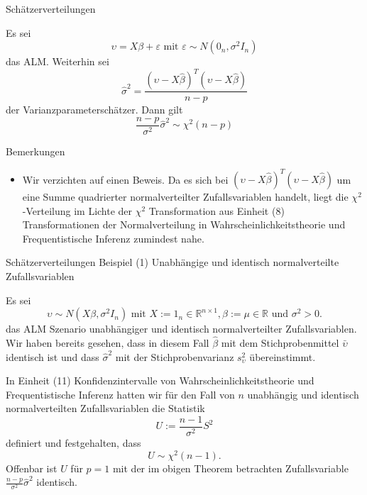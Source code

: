 \documentclass[
  8pt,
  ignorenonframetext,
]{beamer}
\providecommand{\tightlist}{%
  \setlength{\itemsep}{0pt}\setlength{\parskip}{0pt}}
\begin{document}
\begin{frame}{Schätzerverteilungen}
\protect\hypertarget{schuxe4tzerverteilungen-4}{}
\footnotesize
\begin{theorem}
\normalfont
\justifying
Es sei
\begin{equation}
\upsilon = X\beta + \varepsilon \mbox{ mit } \varepsilon \sim N(0_n,\sigma^2I_n)
\end{equation}
das ALM. Weiterhin sei
\begin{equation}
\hat{\sigma}^2 = \frac{(\upsilon -  X\hat{\beta})^T(\upsilon -  X\hat{\beta})}{n-p}
\end{equation}
der Varianzparameterschätzer. Dann gilt
\begin{equation}
\frac{n-p}{\sigma^2}\hat{\sigma}^2 \sim \chi^2(n-p)
\end{equation}
\end{theorem}

Bemerkungen

\begin{itemize}
\tightlist
\item
  \justifying Wir verzichten auf einen Beweis. Da es sich bei
  \((\upsilon-X\hat{\beta})^T(\upsilon-X\hat{\beta})\) um eine Summe
  quadrierter normalverteilter Zufallsvariablen handelt, liegt die
  \(\chi^2\)-Verteilung im Lichte der \(\chi^2\) Transformation aus
  Einheit (8) Transformationen der Normalverteilung in
  Wahrscheinlichkeitstheorie und Frequentistische Inferenz zumindest
  nahe.
\end{itemize}
\end{frame}

\begin{frame}{Schätzerverteilungen}
\protect\hypertarget{schuxe4tzerverteilungen-5}{}
Beispiel (1) Unabhängige und identisch normalverteilte Zufallsvariablen
\vspace{1mm}

\small

Es sei \begin{equation}
\upsilon \sim N(X\beta,\sigma^2 I_n)
\mbox{ mit }
X := 1_n \in \mathbb{R}^{n\times 1},
\beta := \mu \in \mathbb{R}
\mbox{ und } \sigma^2 > 0.
\end{equation} das ALM Szenario unabhängiger und identisch
normalverteilter Zufallsvariablen. Wir haben bereits gesehen, dass in
diesem Fall \(\hat{\beta}\) mit dem Stichprobenmittel \(\bar{\upsilon}\)
identisch ist und dass \(\hat{\sigma}^2\) mit der Stichprobenvarianz
\(s^2_\upsilon\) übereinstimmt.

In Einheit (11) Konfidenzintervalle von Wahrscheinlichkeitstheorie und
Frequentistische Inferenz hatten wir für den Fall von \(n\) unabhängig
und identisch normalverteilten Zufallsvariablen die Statistik
\begin{equation}
U := \frac{n-1}{\sigma^2}S^2
\end{equation} definiert und festgehalten, dass \begin{equation}
U \sim \chi^2(n-1).
\end{equation} Offenbar ist \(U\) für \(p = 1\) mit der im obigen
Theorem betrachten Zufallsvariable
\(\frac{n-p}{\sigma^2}\hat{\sigma}^2\) identisch.
\end{frame}
\end{document}
